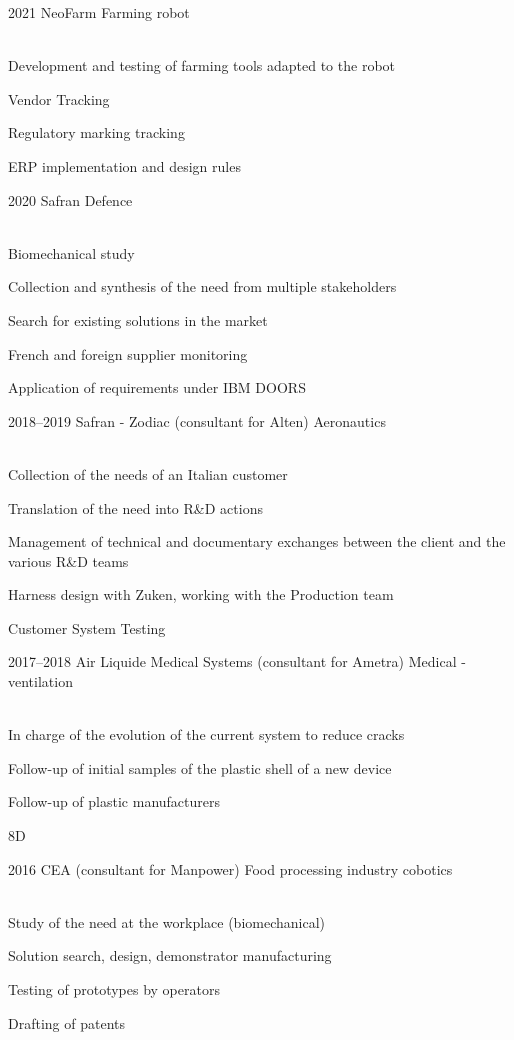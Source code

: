 \documentclass{cv-style}     %
\begin{document}
\begin{entrylist}
\entry
  {2021}
  {NeoFarm}
  {Farming robot}
  {\\
  Development and testing of farming tools adapted to the robot

  Vendor Tracking

  Regulatory marking tracking

  ERP implementation and design rules
   }
 
\entry
  {2020}
  {Safran}
  {Defence}
  {\\
  Biomechanical study

  Collection and synthesis of the need from multiple stakeholders

  Search for existing solutions in the market

  French and foreign supplier monitoring

  Application of requirements under IBM DOORS
  }
\entry
  {2018--2019}
  {Safran - Zodiac (consultant for Alten)}
  {Aeronautics}
  {\\
  Collection of the needs of an Italian customer

  Translation of the need into R\&D actions

  Management of technical and documentary exchanges between the client and the various R\&D teams

  Harness design with Zuken, working with the Production team

  Customer System Testing
 
  }
\entry
 {2017--2018}
 {Air Liquide Medical Systems (consultant for Ametra)}
 {Medical - ventilation}
 {\\
 In charge of the evolution of the current system to reduce cracks

 Follow-up of initial samples of the plastic shell of a new device

 Follow-up of plastic manufacturers

 8D
 }
\entry
 {2016}
 {CEA (consultant for Manpower)}
 {Food processing industry cobotics}
 {\\
 Study of the need at the workplace (biomechanical)

 Solution search, design, demonstrator manufacturing

 Testing of prototypes by operators

 Drafting of patents
 }

\end{entrylist}
\end{document}
